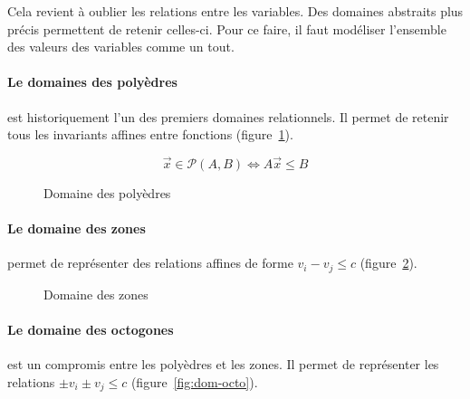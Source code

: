 Cela revient à oublier les relations entre les variables. Des domaines abstraits
plus précis permettent de retenir celles-ci. Pour ce faire, il faut modéliser
l'ensemble des valeurs des variables comme un tout.

\paragraph{Le domaines des polyèdres} est historiquement l'un des premiers
domaines relationnels. Il permet de retenir tous les invariants affines entre
fonctions (figure~\ref{fig:dom-poly}).

\begin{figure}%
  \centering


  \[
  \vec{x} \in \mathcal{P}(A,B) \iff A \vec{x} \le B
  \]

\caption{Domaine des polyèdres}
\label{fig:dom-poly}

\end{figure}%

\paragraph{Le domaine des zones} permet de représenter des relations affines de
forme $v_i - v_j \le c$ (figure~\ref{fig:dom-zones}).

\begin{figure}%
  \centering

  \caption{Domaine des zones}
  \label{fig:dom-zones}
\end{figure}%

\paragraph{Le domaine des octogones} est un compromis entre les polyèdres et les
zones. Il permet de représenter les relations $\pm v_i \pm v_j \le c$
(figure~\ref{fig:dom-octo}).

